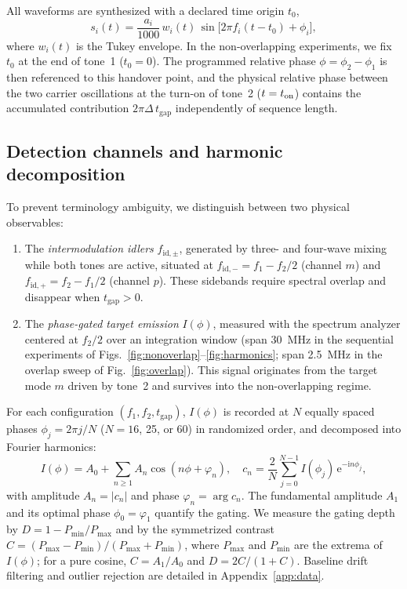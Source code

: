 \documentclass[aps,prb,reprint,superscriptaddress,floatfix]{revtex4-2}
\newcommand{\ii}{\mathrm{i}}
\newcommand{\ee}{\mathrm{e}}
\newcommand{\tgap}{t_{\mathrm{gap}}}
\begin{document}
All waveforms are synthesized with a declared time origin $t_0$,
\begin{equation}
s_i(t)=\frac{a_i}{1000}\,w_i(t)\,\sin\!\big[2\pi f_i(t-t_0)+\phi_i\big],
\label{eq:waveform}
\end{equation}
where $w_i(t)$ is the Tukey envelope. In the non-overlapping experiments, we fix $t_0$ at the end of tone~1 ($t_0=0$). The programmed relative phase $\phi=\phi_2-\phi_1$ is then referenced to this handover point, and the physical relative phase between the two carrier oscillations at the turn-on of tone~2 ($t=t_{\rm on}$) contains the accumulated contribution $2\pi\Delta\,\tgap$ independently of sequence length.

\subsection{Detection channels and harmonic decomposition}\label{sec:analysis}

To prevent terminology ambiguity, we distinguish between two physical observables:
\begin{enumerate}
\item The \emph{intermodulation idlers} $f_{\mathrm{id},\pm}$, generated by three- and four-wave mixing while both tones are active, situated at $f_{\mathrm{id},-}=f_1-f_2/2$ (channel $m$) and $f_{\mathrm{id},+}=f_2-f_1/2$ (channel $p$). These sidebands require spectral overlap and disappear when $\tgap>0$.
\item The \emph{phase-gated target emission} $I(\phi)$, measured with the spectrum analyzer centered at $f_2/2$ over an integration window (span \SI{30}{\mega\hertz} in the sequential experiments of Figs.~\ref{fig:nonoverlap}--\ref{fig:harmonics}; span \SI{2.5}{\mega\hertz} in the overlap sweep of Fig.~\ref{fig:overlap}). This signal originates from the target mode $m$ driven by tone~2 and survives into the non-overlapping regime.
\end{enumerate}

For each configuration $(f_1,f_2,\tgap)$, $I(\phi)$ is recorded at $N$ equally spaced phases $\phi_j=2\pi j/N$ ($N=16$, 25, or 60) in randomized order, and decomposed into Fourier harmonics:
\begin{equation}
I(\phi)=A_0+\sum_{n\ge1}A_n\cos(n\phi+\varphi_n),\quad c_n=\frac{2}{N}\sum_{j=0}^{N-1}I(\phi_j)\,\ee^{-\ii n\phi_j},
\label{eq:dft}
\end{equation}
with amplitude $A_n=|c_n|$ and phase $\varphi_n=\arg c_n$. The fundamental amplitude $A_1$ and its optimal phase $\phi_0=\varphi_1$ quantify the gating. We measure the gating depth by $D=1-P_{\min}/P_{\max}$ and by the symmetrized contrast $C=(P_{\max}-P_{\min})/(P_{\max}+P_{\min})$, where $P_{\max}$ and $P_{\min}$ are the extrema of $I(\phi)$; for a pure cosine, $C=A_1/A_0$ and $D=2C/(1+C)$. Baseline drift filtering and outlier rejection are detailed in Appendix~\ref{app:data}.
\end{document}
